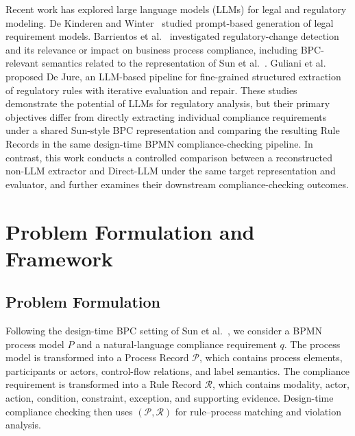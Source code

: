 \documentclass[conference]{IEEEtran}
\begin{document}
Recent work has explored large language models (LLMs) for legal and regulatory modeling. De Kinderen and Winter~\cite{de2024towards} studied prompt-based generation of legal requirement models. Barrientos et al.~\cite{barrientos2026impact,barrientos2026taming} investigated regulatory-change detection and its relevance or impact on business process compliance, including BPC-relevant semantics related to the representation of Sun et al.~\cite{sun2024design}. Guliani et al.~\cite{guliani2026dejure} proposed De Jure, an LLM-based pipeline for fine-grained structured extraction of regulatory rules with iterative evaluation and repair. These studies demonstrate the potential of LLMs for regulatory analysis, but their primary objectives differ from directly extracting individual compliance requirements under a shared Sun-style BPC representation and comparing the resulting Rule Records in the same design-time BPMN compliance-checking pipeline. In contrast, this work conducts a controlled comparison between a reconstructed non-LLM extractor and Direct-LLM under the same target representation and evaluator, and further examines their downstream compliance-checking outcomes.


\section{Problem Formulation and Framework}
\label{sec:3}

\subsection{Problem Formulation}
\label{sec:3.1}

Following the design-time BPC setting of Sun et al.~\cite{sun2024design}, we consider a BPMN process model \(P\) and a natural-language compliance requirement \(q\). The process model is transformed into a Process Record \(\mathcal{P}\), which contains process elements, participants or actors, control-flow relations, and label semantics. The compliance requirement is transformed into a Rule Record \(\mathcal{R}\), which contains modality, actor, action, condition, constraint, exception, and supporting evidence. Design-time compliance checking then uses \((\mathcal{P}, \mathcal{R})\) for rule--process matching and violation analysis.
\end{document}
